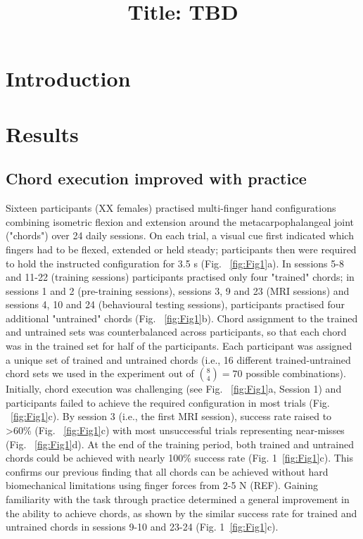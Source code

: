 \documentclass{article}
\title{Title: TBD}
\author{}
\begin{document}
\maketitle

\section{Introduction}

\section{Results}

\subsection{Chord execution improved with practice}

Sixteen participants (XX females) practised multi-finger hand configurations combining isometric flexion and extension around the metacarpophalangeal joint ("chords") over 24 daily sessions. On each trial, a visual cue first indicated which fingers had to be flexed, extended or held steady; participants then were required to hold the instructed configuration  for 3.5 s (Fig. ~\ref{fig:Fig1}a). In sessions 5-8 and 11-22 (training sessions) participants practised only four "trained" chords; in sessions 1 and 2 (pre-training sessions), sessions 3, 9 and 23 (MRI sessions) and sessions 4, 10 and 24 (behavioural testing sessions), participants practised four additional "untrained" chords (Fig. ~\ref{fig:Fig1}b). Chord assignment to the trained and untrained sets was counterbalanced across participants, so that each chord was in the trained set for half of the participants. Each participant was assigned a unique set of trained and untrained chords (i.e., 16 different trained-untrained chord sets we used in the experiment out of $\binom{8}{4}=70$ possible combinations).\\

Initially, chord execution was challenging (see Fig. ~\ref{fig:Fig1}a, Session 1) and participants failed to achieve the required configuration in most trials (Fig. ~\ref{fig:Fig1}c). By session 3 (i.e., the first MRI session), success rate raised to >60\% (Fig. ~\ref{fig:Fig1}c) with most unsuccessful trials representing near-misses (Fig. ~\ref{fig:Fig1}d). At the end of the training period, both trained and untrained chords could be achieved with nearly 100\% success rate (Fig. 1~\ref{fig:Fig1}c). This confirms our previous finding that all chords can be achieved without hard biomechanical limitations using finger forces from 2-5 N (REF). Gaining familiarity with the task through practice determined a general improvement in the ability to achieve chords, as shown by the similar success rate for trained and untrained chords in sessions 9-10 and 23-24 (Fig. 1~\ref{fig:Fig1}c). \\
\end{document}
